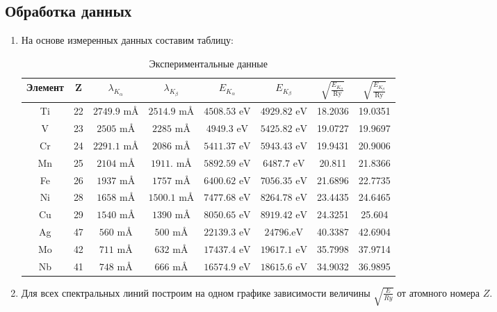 \documentclass[a4paper, 12pt]{article}
\begin{document}
\subsection{Обработка данных}
\begin{enumerate}
	\item На основе измеренных данных составим таблицу:
	\newpage
	\begin{table}[!htb]
		\centering
		\caption{Экспериментальные данные}
		\begin{tabular}{|c|c|c|c|c|c|c|c|}
			\hline
			Элемент & Z & $\lambda _{K_{\alpha }}$ & $\lambda _{K_{\beta }}$ & $E_{K_{\alpha}}$ & $E_{K_{\beta }}$ & $\sqrt{\frac{E_{K_{\alpha}}}{\text{Ry}}}$ & $\sqrt{\frac{E_{K_{\beta}}}{\text{Ry}}}$ \\
			\hline
   			Ti & 22 & $2749.9\text{ m{\AA}}$ & $2514.9\text{ m{\AA}}$ & $4508.53\text{ eV}$ & $4929.82\text{ eV}$ & 18.2036 & 19.0351 \\
   			V & 23 & $2505\text{ m{\AA}}$ & $2285\text{ m{\AA}}$ & $4949.3\text{ eV}$ & $5425.82\text{ eV}$ & 19.0727 & 19.9697 \\
   			Cr & 24 & $2291.1\text{ m{\AA}}$ & $2086\text{ m{\AA}}$ & $5411.37\text{ eV}$ & $5943.43\text{ eV}$ & 19.9431 & 20.9006 \\
   			Mn & 25 & $2104\text{ m{\AA}}$ & $1911.\text{ m{\AA}}$ & $5892.59\text{ eV}$ & $6487.7\text{ eV}$ & 20.811 & 21.8366 \\
   			Fe & 26 & $1937\text{ m{\AA}}$ & $1757\text{ m{\AA}}$ & $6400.62\text{ eV}$ & $7056.35\text{ eV}$ & 21.6896 & 22.7735 \\
   			Ni & 28 & $1658\text{ m{\AA}}$ & $1500.1\text{ m{\AA}}$ & $7477.68\text{ eV}$ & $8264.78\text{ eV}$ & 23.4435 & 24.6465 \\
			Cu & 29 & $1540\text{ m{\AA}}$ & $1390\text{ m{\AA}}$ & $8050.65\text{ eV}$ & $8919.42\text{ eV}$ & 24.3251 & 25.604 \\
			Ag & 47 & $560\text{ m{\AA}}$ & $500\text{ m{\AA}}$ & $22139.3\text{ eV}$ & $24796.\text{eV}$ & 40.3387 & 42.6904 \\
			Mo & 42 & $711\text{ m{\AA}}$ & $632\text{ m{\AA}}$ & $17437.4\text{ eV}$ & $19617.1\text{ eV}$ & 35.7998 & 37.9714 \\
			Nb & 41 & $748\text{ m{\AA}}$ & $666\text{ m{\AA}}$ & $16574.9\text{ eV}$ & $18615.6\text{ eV}$ & 34.9032 & 36.9895 \\
			\hline
		\end{tabular}
	\end{table}
	\item Для всех спектральных линий построим на одном графике зависимости величины $\sqrt{\frac{E}{Ry}}$ от атомного номера $Z$.

\end{enumerate}
\end{document}
